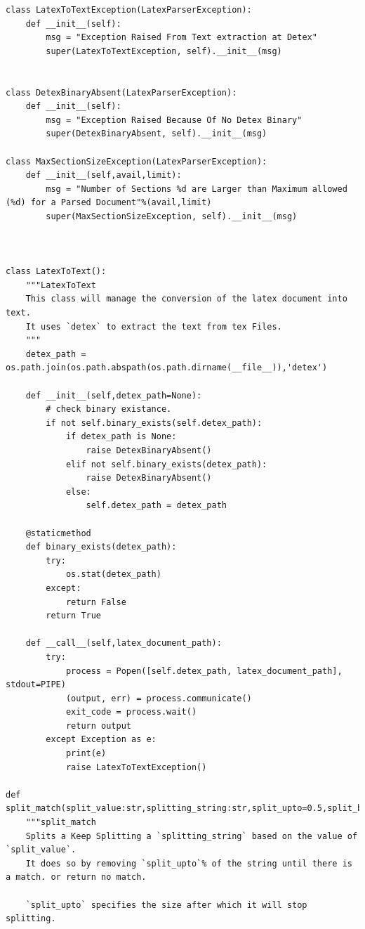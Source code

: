 \begin{lstlisting}
class LatexToTextException(LatexParserException):
    def __init__(self):
        msg = "Exception Raised From Text extraction at Detex"
        super(LatexToTextException, self).__init__(msg)


class DetexBinaryAbsent(LatexParserException):
    def __init__(self):
        msg = "Exception Raised Because Of No Detex Binary"
        super(DetexBinaryAbsent, self).__init__(msg)

class MaxSectionSizeException(LatexParserException):
    def __init__(self,avail,limit):
        msg = "Number of Sections %d are Larger than Maximum allowed (%d) for a Parsed Document"%(avail,limit)
        super(MaxSectionSizeException, self).__init__(msg)



class LatexToText():
    """LatexToText 
    This class will manage the conversion of the latex document into text. 
    It uses `detex` to extract the text from tex Files. 
    """
    detex_path = os.path.join(os.path.abspath(os.path.dirname(__file__)),'detex')

    def __init__(self,detex_path=None):
        # check binary existance. 
        if not self.binary_exists(self.detex_path):
            if detex_path is None:
                raise DetexBinaryAbsent()
            elif not self.binary_exists(detex_path):
                raise DetexBinaryAbsent()
            else:
                self.detex_path = detex_path
        
    @staticmethod
    def binary_exists(detex_path):
        try:
            os.stat(detex_path)
        except:
            return False
        return True
    
    def __call__(self,latex_document_path):
        try:
            process = Popen([self.detex_path, latex_document_path], stdout=PIPE)
            (output, err) = process.communicate()
            exit_code = process.wait()
            return output
        except Exception as e:
            print(e)
            raise LatexToTextException()

def split_match(split_value:str,splitting_string:str,split_upto=0.5,split_bins=10):
    """split_match 
    Splits a Keep Splitting a `splitting_string` based on the value of `split_value`.
    It does so by removing `split_upto`% of the string until there is a match. or return no match. 
    
    `split_upto` specifies the size after which it will stop splitting. 


\end{lstlisting}
